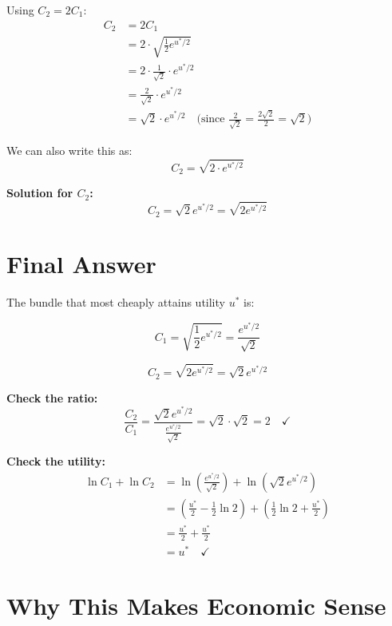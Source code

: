 \documentclass[12pt]{article}
\begin{document}
Using $C_2 = 2C_1$:
\begin{align*}
C_2 &= 2C_1 \\
&= 2 \cdot \sqrt{\frac{1}{2}e^{u^*/2}} \\
&= 2 \cdot \frac{1}{\sqrt{2}} \cdot e^{u^*/2} \\
&= \frac{2}{\sqrt{2}} \cdot e^{u^*/2} \\
&= \sqrt{2} \cdot e^{u^*/2} \quad \text{(since } \frac{2}{\sqrt{2}} = \frac{2\sqrt{2}}{2} = \sqrt{2}\text{)}
\end{align*}

We can also write this as:
\[C_2 = \sqrt{2 \cdot e^{u^*/2}}\]

\begin{tcolorbox}[colback=yellow!20!white,colframe=orange!75!black]
\textbf{Solution for $C_2$:}
\[\boxed{C_2 = \sqrt{2}e^{u^*/2} = \sqrt{2e^{u^*/2}}}\]
\end{tcolorbox}

\section*{Final Answer}

\begin{tcolorbox}[colback=green!5!white,colframe=green!75!black]
The bundle that most cheaply attains utility $u^*$ is:

\[C_1 = \sqrt{\frac{1}{2}e^{u^*/2}} = \frac{e^{u^*/2}}{\sqrt{2}}\]

\[C_2 = \sqrt{2e^{u^*/2}} = \sqrt{2}e^{u^*/2}\]

\vspace{0.3cm}

\textbf{Check the ratio:}
\[\frac{C_2}{C_1} = \frac{\sqrt{2}e^{u^*/2}}{\frac{e^{u^*/2}}{\sqrt{2}}} = \sqrt{2} \cdot \sqrt{2} = 2 \quad \checkmark\]

\textbf{Check the utility:}
\begin{align*}
\ln C_1 + \ln C_2 &= \ln\left(\frac{e^{u^*/2}}{\sqrt{2}}\right) + \ln\left(\sqrt{2}e^{u^*/2}\right) \\
&= \left(\frac{u^*}{2} - \frac{1}{2}\ln 2\right) + \left(\frac{1}{2}\ln 2 + \frac{u^*}{2}\right) \\
&= \frac{u^*}{2} + \frac{u^*}{2} \\
&= u^* \quad \checkmark
\end{align*}
\end{tcolorbox}

\newpage

\section*{Why This Makes Economic Sense}
\end{document}
